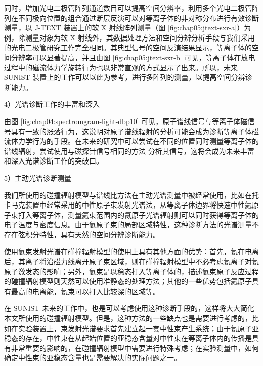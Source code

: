 同时，增加光电二极管阵列通道数目可以提高空间分辨率，利用多个光电二极管阵列在不同极向位置的组合通过断层反演可以对等离子体的非对称分布进行有效诊断测量，以 J-TEXT 装置上的软 X 射线阵列测量（图 \ref{fig:chap05:jtext-sxr-a}）为例\cite{JTextSXR}，除测量对象为软 X 射线外，其数据处理方法和空间分辨分析手段与我们采用的光电二极管研究工作完全相同。其典型信号的空间反演结果显示，等离子体的空间分辨率可以显著提高，并且由图 \ref{fig:chap05:jtext-sxr-b} 可见，等离子体在放电过程中的磁流体力学旋转行为也以非常直观的方式显示了出来。所以，未来 SUNIST 装置上的工作可以以此为参考，进行多阵列的测量，以提高空间分辨诊断能力。

4）光谱诊断工作的丰富和深入

由图 \ref{fig:chap04:spectromgram-light-dbp10} 可见，原子谱线信号与等离子体磁信号具有一致的涨落行为，这说明对原子谱线辐射的分析可能会成为诊断等离子体磁流体力学行为的手段。在未来的研究中可以尝试在不同的位置同时测量等离子体的谱线辐射，尝试使用与磁探针信号相同的方法\cite{ZengLong2010:Thesis} 分析其信号，这将会成为未来丰富和深入光谱诊断工作的突破口。

5）主动光谱诊断测量

我们所使用的碰撞辐射模型与谱线比方法在主动光谱测量中被经常使用，比如在托卡马克装置中经常采用的中性原子束发射光谱法\cite{Schmitz2008}，从等离子体边界将快速中性氦原子束打入等离子体，测量氦束范围内的氦原子光谱辐射则可以同时获得等离子体的电子温度与密度信息。由于氦原子束的局部区域特性，这种诊断方法的光谱测量不存在弦积分特性，具有天然的空间分辨诊断能力。

使用氦束发射光谱在碰撞辐射模型的使用上具有其他方面的优势：首先，氦在电离后，其离子将沿磁力线离开原子束区域，则在碰撞辐射模型中不必考虑氦离子对氦原子激发态的影响；另外，氦束是以稳态打入等离子体的，描述氦束原子反应过程的碰撞辐射模型则天然可以使用准静态的处理方法；其他的一些优势包括氦原子具有最高的电离能，氦束可以打入比较深的区域等。

在 SUNIST 未来的工作中，也是可以考虑使用这种诊断手段的，这样将大大简化本文所使用的碰撞辐射模型。但是，这种方法的一些缺点也是需要进行考虑的，比如在实验装置上，束发射光谱要求首先建立起一套中性束产生系统；由于氦原子亚稳态的存在，中性束在从起始位置的亚稳态含量对中性束在等离子体内的传播是具有非常重要的影响的，在碰撞辐射模型中需要进行特殊考虑；在实验测量中，如何确定中性束的亚稳态含量也是需要解决的实际问题之一。

%
%
